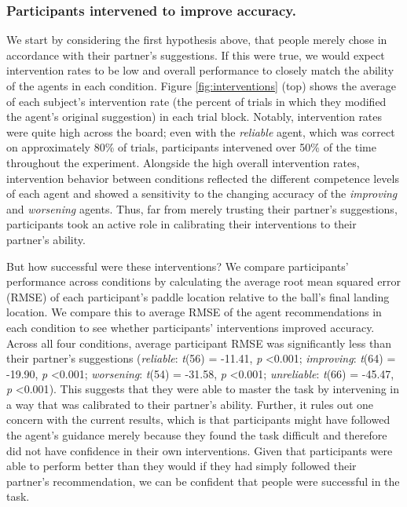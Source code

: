 \documentclass[10pt,letterpaper]{article}
\begin{document}
\subsubsection{Participants intervened to improve accuracy.} 

We start by considering the first hypothesis above, that people merely chose in accordance with their partner's suggestions. If this were true, we would expect intervention rates to be low and overall performance to closely match the ability of the agents in each condition. Figure \ref{fig:interventions} (top) shows the average of each subject's intervention rate (the percent of trials in which they modified the agent's original suggestion) in each trial block. Notably, intervention rates were quite high across the board; even with the \textit{reliable} agent, which was correct on approximately 80\% of trials, participants intervened over 50\% of the time throughout the experiment. Alongside the high overall intervention rates, intervention behavior between conditions reflected the different competence levels of each agent and showed a sensitivity to the changing accuracy of the \textit{improving} and \textit{worsening} agents. Thus, far from merely trusting their partner's suggestions, participants took an active role in calibrating their interventions to their partner's ability.

But how successful were these interventions? We compare participants' performance across conditions by calculating the average root mean squared error (RMSE) of each participant's paddle location relative to the ball's final landing location. We compare this to average RMSE of the agent recommendations in each condition to see whether participants' interventions improved accuracy. Across all four conditions, average participant RMSE was significantly less than their partner's suggestions (\textit{reliable}: \textit{t}(56) = -11.41, \textit{p} \textless{0.001}; \textit{improving}: \textit{t}(64) = -19.90, \textit{p} \textless{0.001}; \textit{worsening}: \textit{t}(54) = -31.58, \textit{p} \textless{0.001}; \textit{unreliable}: \textit{t}(66) = -45.47, \textit{p} \textless{0.001}). This suggests that they were able to master the task by intervening in a way that was calibrated to their partner's ability. Further, it rules out one concern with the current results, which is that participants might have followed the agent's guidance merely because they found the task difficult and therefore did not have confidence in their own interventions. Given that participants were able to perform better than they would if they had simply followed their partner's recommendation, we can be confident that people were successful in the task.
\end{document}
